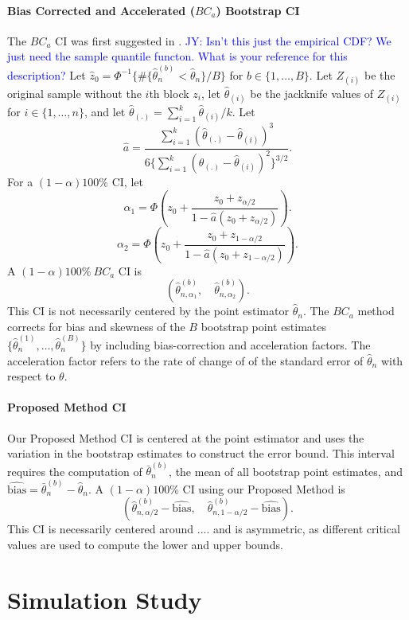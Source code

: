 \documentclass[12pt, letterpaper, titlepage]{article}
\newcommand{\jy}[1]{\textcolor{blue}{JY: #1}}
\begin{document}
\paragraph{Bias Corrected and Accelerated ($BC_a$) Bootstrap CI}
The $BC_a$ CI was first suggested in \citet{efron1987better}.
\jy{Isn't this just the empirical CDF? We just need the sample quantile functon.
  What is your reference for this description?}
Let $\hat{z}_0 = \Phi^{-1}\{\#\{\hat\theta_n^{(b)} < \hat{\theta}_n\} / B\}$
for $b \in \{1, \ldots, B\}$. 
Let $Z_{(i)}$ be the original sample without the $i$th block $z_i$, let
$\hat{\theta}_{(i)}$ be the jackknife values of $Z_{(i)}$
for $i \in \{1, \ldots, n\}$, 
and let $\hat{\theta}_{(.)} = \sum_{i=1}^{k} \hat{\theta}_{(i)} / k$. 
Let 
\[
\hat{a} = \frac{\sum_{i=1}^{k} (\hat{\theta}_{(.)} -
  \hat{\theta}_{(i)})^3}{6\{\sum_{i=1}^{k} (\hat{\theta}_{(.)} -
  \hat{\theta}_{(i)})^2\}^{3/2}}
.\] For a $(1 - \alpha)100\%$ CI, let
\[
\alpha_1 = \Phi\left(z_0 + \frac{z_{0} +
  z_{\alpha/2}}{1 - \hat{a}(z_{0} + z_{\alpha/2})}\right).
\]
\[
\alpha_2 = \Phi\left(z_0 + \frac{z_{0} +
  z_{1 - \alpha/2}}{1 - \hat{a}(z_{0} + z_{1 - \alpha/2})}\right).
\]
A $(1 - \alpha)100\%~BC_a$ CI is
\[
(\hat\theta_{n, \alpha_1}^{(b)}, \quad \hat\theta_{n, \alpha_2}^{(b)}).
\]
This CI is not necessarily centered by the point estimator $\hat\theta_n$. The
$BC_a$ method corrects for bias and skewness of the $B$ bootstrap point
estimates $\{\hat\theta_n^{(1)}, \ldots, \hat\theta_n^{(B)}\}$ by including
bias-correction and acceleration factors. The acceleration factor refers to
the 
rate of change of of the standard error of $\hat\theta_n$ with respect to
$\theta$.

\paragraph{Proposed Method CI}
Our Proposed Method CI is centered at the point estimator and uses the
variation
in the bootstrap estimates to construct the error bound. This interval requires
the computation of $\bar\theta_n^{(b)}$, the mean of all bootstrap point
estimates, and $\widehat{\text{bias}} = \bar\theta_n^{(b)} - \hat\theta_n$.
A $(1 - \alpha)100\%$ CI using our Proposed Method is
\[
(\hat\theta_{n, \alpha/2}^{(b)} - \widehat{\text{bias}}, \quad
\hat\theta_{n, 1 - \alpha/2}^{(b)} - \widehat{\text{bias}}).
\]
This CI is necessarily centered around .... and
is asymmetric, as different critical values are used to compute
the lower and upper bounds.

\section{Simulation Study}
\label{sec:simu}
\end{document}
